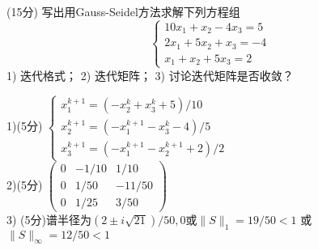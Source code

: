 \documentclass[12pt,letter]{ustcexam}
\begin{document}
\begin{problems}
\newpage
\qu (15分)  写出用Gauss-Seidel方法求解下列方程组
$$\begin {cases} 10x_1+x_2-4x_3=5\\ 2 x_1+5x_2+ x_3=-4 \\ x_1+x_2+5x_3=2
\end{cases}$$
1) 迭代格式；  2) 迭代矩阵； 3) 讨论迭代矩阵是否收敛？
\begin{sol}
1)(5分)
$
\left\{\begin{array}{l}
x_1^{k+1}=(-x_2^k+x_3^k+5)/10 \\
x_2^{k+1}=(-x_1^{k+1}-x_3^k-4)/5 \\
x_3^{k+1}=(-x_1^{k+1}-x_2^{k+1}+2)/2
\end{array}\right.
$ \\
2)(5分)
$
\left(\begin{array}{ccc}
0 & -1/10 & 1/10 \\
0 & 1/50 & -11/50 \\
0 & 1/25 & 3/50
\end{array}\right)
$ \\
3) (5分)谱半径为$(2\pm i\sqrt{21})/50,0$或$\|S\|_1=19/50<1$
   或$\|S\|_{\infty}=12/50<1$
\end{sol}


\end{problems}
\end{document}
